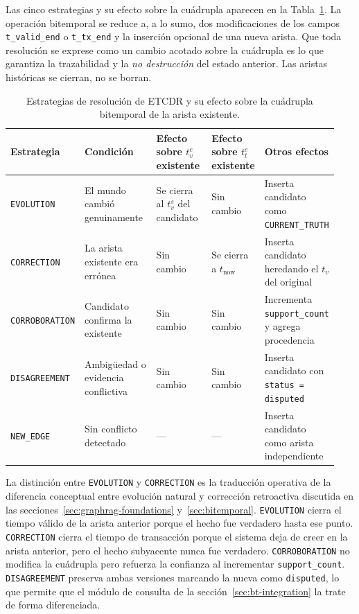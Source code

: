 Las cinco estrategias y su efecto sobre la cuádrupla aparecen en la Tabla~\ref{tab:etcdr-strategies}. La operación bitemporal se reduce a, a lo sumo, dos modificaciones de los campos \texttt{t\_valid\_end} o \texttt{t\_tx\_end} y la inserción opcional de una nueva arista. Que toda resolución se exprese como un cambio acotado sobre la cuádrupla es lo que garantiza la trazabilidad y la \emph{no destrucción} del estado anterior. Las aristas históricas se cierran, no se borran.

\begin{table}[h]
\centering
\small
\begin{tabular}{p{0.16\linewidth}p{0.24\linewidth}p{0.18\linewidth}p{0.16\linewidth}p{0.20\linewidth}}
\hline
\textbf{Estrategia} & \textbf{Condición} & \textbf{Efecto sobre $t_v^e$ existente} & \textbf{Efecto sobre $t_t^e$ existente} & \textbf{Otros efectos} \\ \hline
\texttt{EVOLUTION} & El mundo cambió genuinamente & Se cierra al $t_v^s$ del candidato & Sin cambio & Inserta candidato como \texttt{CURRENT\_TRUTH} \\
\texttt{CORRECTION} & La arista existente era errónea & Sin cambio & Se cierra a $t_{\text{now}}$ & Inserta candidato heredando el $t_v$ del original \\
\texttt{CORROBORATION} & Candidato confirma la existente & Sin cambio & Sin cambio & Incrementa \texttt{support\_count} y agrega procedencia \\
\texttt{DISAGREEMENT} & Ambigüedad o evidencia conflictiva & Sin cambio & Sin cambio & Inserta candidato con \texttt{status = disputed} \\
\texttt{NEW\_EDGE} & Sin conflicto detectado & --- & --- & Inserta candidato como arista independiente \\ \hline
\end{tabular}
\caption{Estrategias de resolución de ETCDR y su efecto sobre la cuádrupla bitemporal de la arista existente.}
\label{tab:etcdr-strategies}
\end{table}

La distinción entre \texttt{EVOLUTION} y \texttt{CORRECTION} es la traducción operativa de la diferencia conceptual entre evolución natural y corrección retroactiva discutida en las secciones~\ref{sec:graphrag-foundations} y~\ref{sec:bitemporal}. \texttt{EVOLUTION} cierra el tiempo válido de la arista anterior porque el hecho fue verdadero hasta ese punto. \texttt{CORRECTION} cierra el tiempo de transacción porque el sistema deja de creer en la arista anterior, pero el hecho subyacente nunca fue verdadero. \texttt{CORROBORATION} no modifica la cuádrupla pero refuerza la confianza al incrementar \texttt{support\_count}. \texttt{DISAGREEMENT} preserva ambas versiones marcando la nueva como \texttt{disputed}, lo que permite que el módulo de consulta de la sección~\ref{sec:bt-integration} la trate de forma diferenciada.

